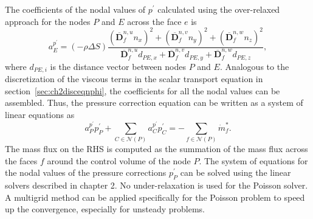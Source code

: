 The coefficients of the nodal values of $p^{\prime}$ calculated using the over-relaxed approach for the nodes $P$ and $E$ across the face $e$ is
\begin{equation}
a_{E}^{p^{\prime}} = (-\rho\Delta S)\frac{(\overline{\boldsymbol{D}}_{f}^{n,u}n_x)^2+(\overline{\boldsymbol{D}}_{f}^{n,v}n_y)^2+(\overline{\boldsymbol{D}}_{f}^{n,w}n_z)^2}{\overline{\boldsymbol{D}}_{f}^{n,u}d_{PE,x}+\overline{\boldsymbol{D}}_{f}^{n,v}d_{PE,y}+\overline{\boldsymbol{D}}_{f}^{n,w}d_{PE,z}},
\end{equation}
where $d_{PE,i}$ is the distance vector between nodes $P$ and $E$. Analogous to the discretization of the viscous terms in the scalar transport equation in section~\ref{sec:ch2disceqnphi}, the coefficients for all the nodal values can be assembled.  Thus, the pressure correction equation can be written as a system of linear equations as
\begin{equation}
a_P^{p^{\prime}} p_P^{\prime} + \sum_{C\in \mathcal{N}(P)}a_{C}^{p^{\prime}}p^{\prime}_C = -\sum_{f\in \mathcal{N}(P)} \dot{m}^{\ast}_f.
\end{equation}
The mass flux on the RHS is computed as the summation of the mass flux across the faces $f$ around the control volume of the node $P$. The system of equations for the nodal values of the pressure corrections $p^{\prime}_P$ can be solved using the linear solvers described in chapter 2. No under-relaxation is used for the Poisson solver. A multigrid method can be applied specifically for the Poisson problem to speed up the convergence, especially for unsteady problems.

